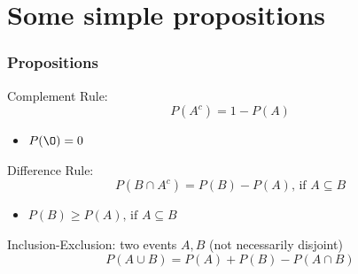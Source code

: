 \documentclass[slidestop,compress,mathserif]{beamer}
\begin{document}
%

\section{Some simple propositions}
\begin{frame}\frametitle{Propositions}
\begin{dinglist}{\DingListSymbolA}
\item Complement Rule:
\[P(A^c) = 1-P(A)\]
\end{dinglist}

\begin{itemize}
\item $ P(\O) = 0 $
\end{itemize}

\begin{dinglist}{\DingListSymbolA}
\item Difference Rule:
\[  P(B \cap A^c) = P(B)-P(A) \text{, if } A \subseteq B \]
\end{dinglist}

\begin{itemize}
\item $ P(B) \geq P(A) \text{, if } A \subseteq B $
\end{itemize}

\begin{dinglist}{\DingListSymbolA}
\item Inclusion-Exclusion: two events $A, B$ (not necessarily disjoint)
  \[ P(A \cup B) = P(A) + P(B) - P(A \cap B) \]
\end{dinglist}



\end{frame}
\end{document}
